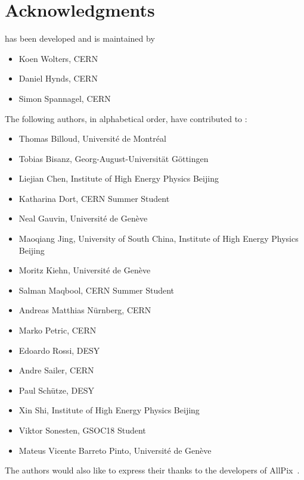\chapter{Acknowledgments}

\apsq has been developed and is maintained by

\begin{itemize}
\item Koen Wolters, CERN
\item Daniel Hynds, CERN
\item Simon Spannagel, CERN
\end{itemize}

The following authors, in alphabetical order, have contributed to \apsq:

\begin{itemize}
\item Thomas Billoud, Université de Montréal
\item Tobias Bisanz, Georg-August-Universität Göttingen
\item Liejian Chen, Institute of High Energy Physics Beijing
\item Katharina Dort, CERN Summer Student
\item Neal Gauvin, Université de Genève
\item Maoqiang Jing, University of South China, Institute of High Energy Physics Beijing
\item Moritz Kiehn, Université de Genève
\item Salman Maqbool, CERN Summer Student
\item Andreas Matthias Nürnberg, CERN
\item Marko Petric, CERN
\item Edoardo Rossi, DESY
\item Andre Sailer, CERN
\item Paul Schütze, DESY
\item Xin Shi, Institute of High Energy Physics Beijing
\item Viktor Sonesten, GSOC18 Student
\item Mateus Vicente Barreto Pinto, Université de Genève
\end{itemize}

The authors would also like to express their thanks to the developers of AllPix~\cite{ap1wiki,ap1git}.
